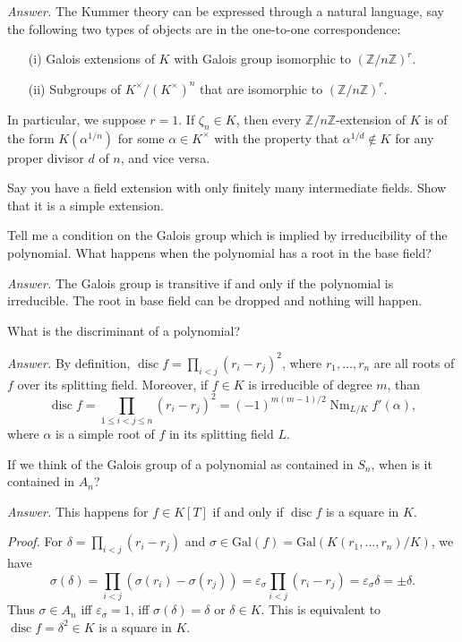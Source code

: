 \documentclass{mathproblems}
\newcommand\Z{\mathbb{Z}}
\newcommand\Gal{\mathrm{Gal}}
\DeclareMathOperator{\disc}{disc}
\begin{document}
\begin{questions}
\textit{Answer.} The Kummer theory can be expressed through a natural language, say the following two types of objects are in the one-to-one correspondence: \vspace{-4pt}
\begin{itemize}
\item[(i)] Galois extensions of $K$ with Galois group isomorphic to $(\Z/n\Z)^r$.

\item[(ii)] Subgroups of $K^\times/(K^\times)^n$ that are isomorphic to $(\Z/n\Z)^r$.
\end{itemize}\vspace{-4pt}
In particular, we suppose $r=1$. If $\zeta_n \in K$, then every $\mathbb{Z} / n \mathbb{Z}$-extension of $K$ is of the form $K(\alpha^{1 / n})$ for some $\alpha \in K^\times$ with the property that $\alpha^{1 / d} \notin K$ for any proper divisor $d$ of $n$, and vice versa. 


\miquestion
{\color{blue} Say you have a field extension with only finitely many intermediate fields. Show that it is a simple extension.}

\miquestion
{\color{blue} Tell me a condition on the Galois group which is implied by irreducibility of the polynomial. What happens when the polynomial has a root in the base field?}

\textit{Answer.}
The Galois group is transitive if and only if the polynomial is irreducible. The root in base field can be dropped and nothing will happen.

\miquestion
{\color{blue} What is the discriminant of a polynomial?}

\textit{Answer.}
By definition, $\operatorname{disc} f=\prod_{i<j}(r_i-r_j)^2$, where $r_1,\ldots,r_n$ are all roots of $f$ over its splitting field. Moreover, if $f\in K$ is irreducible of degree $m$, than
$$
\disc f=\prod_{1\leq i<j\leq n}(r_i-r_j)^2=(-1)^{m(m-1)/2}\operatorname{Nm}_{L/K} f'(\alpha),
$$
where $\alpha$ is a simple root of $f$ in its splitting field $L$.

\miquestion
{\color{blue} If we think of the Galois group of a polynomial as contained in $S_{n}$, when is it contained in $A_{n}$?}

\textit{Answer.}
This happens for $f\in K[T]$ if and only if $\operatorname{disc} f$ is a square in $K$. 

\textit{Proof.}
For $\delta=\prod_{i<j}(r_i-r_j)$ and $\sigma\in \Gal(f)=\Gal(K(r_1,\ldots,r_n)/K)$, we have
$$
\sigma (\delta)=\prod_{i<j}(\sigma(r_i)-\sigma(r_j))=\varepsilon_{\sigma} \prod_{i<j}(r_i-r_j)=\varepsilon_{\sigma} \delta=\pm \delta.
$$
Thus $\sigma\in A_n$ iff $\varepsilon_{\sigma}=1$, iff $\sigma(\delta)=\delta$ or $\delta\in K$. This is equivalent to $\operatorname{disc} f=\delta^2\in K$ is a square in $K$.


\end{questions}
\end{document}
